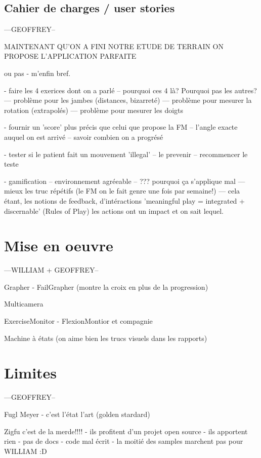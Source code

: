 \documentclass{report}
\begin{document}
		
		\subsection{Cahier de charges / user stories} 		---GEOFFREY--
		
		MAINTENANT QU'ON A FINI NOTRE ETUDE DE TERRAIN ON PROPOSE L'APPLICATION PARFAITE 
		
		ou pas - m'enfin bref.
		
		- faire les 4 exerices dont on a parlé
		-- pourquoi ces 4 là? Pourquoi pas les autres?
		--- problème pour les jambes (distances, bizarreté)
		--- problème pour mesurer la rotation (extrapolés)
		--- problème pour mesurer les doigts 
		
		- fournir un 'score' plus précis que celui que propose la FM
		-- l'angle exacte auquel on est arrivé
		-- savoir combien on a progrésé
		
		- tester si le patient fait un mouvement 'illegal'
		-- le prevenir
		-- recommencer le teste
		
		
		- gamification
		-- environnement agréeable
		-- ??? pourquoi ça s'applique mal
		--- mieux les truc répétifs (le FM on le fait genre une fois par semaine!)
		--- cela étant, les notions de feedback, d'intéractions 
			'meaningful play = integrated + discernable' (Rules of Play) les actions ont un 
			impact et on sait lequel. 
		
		\section{Mise en oeuvre} 		---WILLIAM + GEOFFREY--

		Grapher
		- FailGrapher (montre la croix en plus de la progression)
		
		Multicamera
		
		ExerciseMonitor
		- FlexionMontior et compagnie
		
		Machine à états (on aime bien les trucs visuels dans les rapports)
		
		\section{Limites}		---GEOFFREY--
		
		Fugl Meyer
		- c'est l'état l'art (golden stardard)
		
		Zigfu c'est de la merde!!!!
		- ils profitent d'un projet open source
		- ils apportent rien
		- pas de docs
		- code mal écrit
		- la moitié des samples marchent pas pour WILLIAM :D
		
\end{document}
